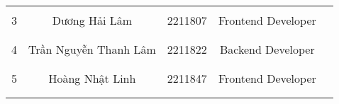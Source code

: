 \begin{table}[H]
\begin{tabular}{|c|c|c|c|p{4cm}|}
                    &                                           &                                   &                                                           &                                                                   \\ \cline{5-5} 
\multirow{-3}{*}{3} & \multirow{-3}{*}{Dương Hải Lâm}           & \multirow{-3}{*}{2211807}         & \multirow{-3}{3cm}{\centering Frontend Developer}                      &                                                                   \\ \hline
                    &                                           &                                   &                                                           &                                                                   \\ \cline{5-5} 
                    &                                           &                                   &                                                           &                                                                   \\ \cline{5-5} 
\multirow{-3}{*}{4} & \multirow{-3}{*}{Trần Nguyễn Thanh Lâm}   & \multirow{-3}{*}{2211822}         & \multirow{-3}{3cm}{\centering Backend Developer}                       &                                                                   \\ \hline
                    &                                           &                                   &                                                           &                                                                   \\ \cline{5-5} 
                    &                                           &                                   &                                                           &                                                                   \\ \cline{5-5}  
\multirow{-3}{*}{5} & \multirow{-3}{*}{Hoàng Nhật Linh}         & \multirow{-3}{*}{2211847}         & \multirow{-3}{3cm}{\centering Frontend Developer}                      &                                                                   \\ \hline
                    &                                           &                                   &                                                           &                                                                   \\ \cline{5-5} 
                    &                                           &                                   &                                                           &                                                                   \\ \cline{5-5}  

\end{tabular}
\end{table}
